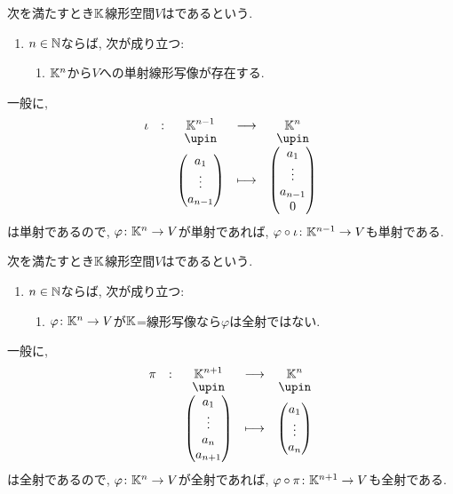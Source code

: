 \begin{definition}
次を満たすとき$\mathbb{K}$線形空間$V$はであるという.
\begin{enumerate}
\item $n\in \mathbb{N}$ならば, 次が成り立つ:
\begin{enumerate}
\item $\mathbb{K}^n$から$V$への単射線形写像が存在する.
\end{enumerate}
\end{enumerate}
\end{definition}
\begin{remark}
一般に,
\begin{align*}
\shazo{\iota}{\KK^{n-1}}{\KK^{n}}
{\begin{pmatrix}a_1\\\vdots\\a_{n-1}\end{pmatrix}}
{\begin{pmatrix}a_1\\\vdots\\a_{n-1}\\0\end{pmatrix}}
\end{align*}
は単射であるので,
$\varphi\colon\mathbb{K}^n\to V$が単射であれば,
$\varphi\circ\iota\colon\mathbb{K}^{n-1}\to V$も単射である.
\end{remark}

\begin{definition}
次を満たすとき$\mathbb{K}$線形空間$V$はであるという.
\begin{enumerate}
\item $n\in \mathbb{N}$ならば, 次が成り立つ:
\begin{enumerate}
\item $\varphi\colon \mathbb{K}^n\to V$が$\mathbb{K}$=線形写像なら$\varphi$は全射ではない.
\end{enumerate}
\end{enumerate}
\end{definition}
\begin{remark}
一般に,
\begin{align*}
\shazo{\pi}{\KK^{n+1}}{\KK^{n}}
{\begin{pmatrix}a_1\\\vdots\\a_{n}\\a_{n+1}\end{pmatrix}}
{\begin{pmatrix}a_1\\\vdots\\a_{n}\end{pmatrix}}
\end{align*}
は全射であるので,
$\varphi\colon\mathbb{K}^n\to V$が全射であれば,
$\varphi\circ\pi\colon\mathbb{K}^{n+1}\to V$も全射である.
\end{remark}

